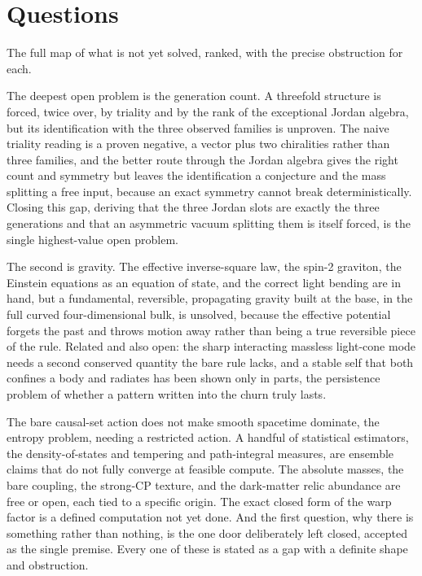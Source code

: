 \section{Questions}

The full map of what is not yet solved, ranked, with the precise obstruction for each.

The deepest open problem is the generation count. A threefold structure is forced, twice over, by triality and by the
rank of the exceptional Jordan algebra, but its identification with the three observed families is unproven. The naive
triality reading is a proven negative, a vector plus two chiralities rather than three families, and the better route
through the Jordan algebra gives the right count and symmetry but leaves the identification a conjecture and the mass
splitting a free input, because an exact symmetry cannot break deterministically. Closing this gap, deriving that the
three Jordan slots are exactly the three generations and that an asymmetric vacuum splitting them is itself forced, is the
single highest-value open problem.

The second is gravity. The effective inverse-square law, the spin-2 graviton, the Einstein equations as an equation of
state, and the correct light bending are in hand, but a fundamental, reversible, propagating gravity built at the base,
in the full curved four-dimensional bulk, is unsolved, because the effective potential forgets the past and throws motion
away rather than being a true reversible piece of the rule. Related and also open: the sharp interacting massless
light-cone mode needs a second conserved quantity the bare rule lacks, and a stable self that both confines a body and
radiates has been shown only in parts, the persistence problem of whether a pattern written into the churn truly lasts.

The bare causal-set action does not make smooth spacetime dominate, the entropy problem,
needing a restricted action. A handful of statistical estimators, the density-of-states and tempering and path-integral
measures, are ensemble claims that do not fully converge at feasible compute. The absolute masses, the bare coupling,
the strong-CP texture, and the dark-matter relic abundance are free or open, each tied to a specific origin. The exact
closed form of the warp factor is a defined computation not yet done. And the first question, why there is something
rather than nothing, is the one door deliberately left closed, accepted as the single premise. Every one of these is
stated as a gap with a definite shape and obstruction.
